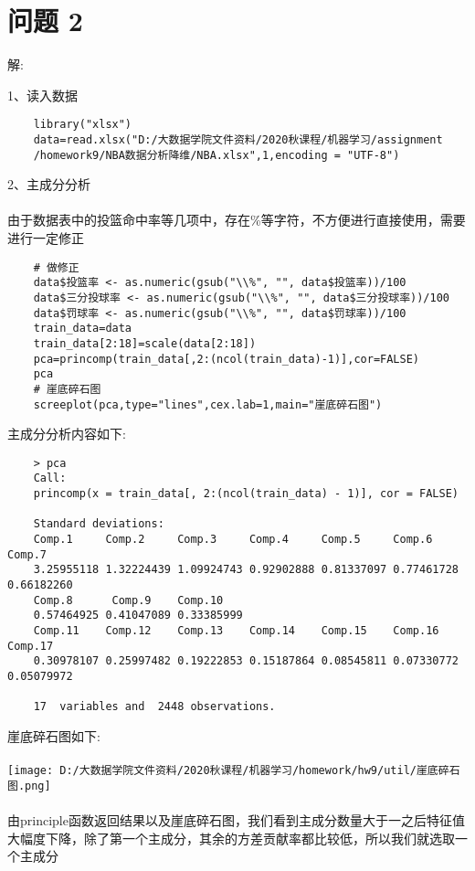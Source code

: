 \documentclass[]{article}
\begin{document}
\section{问题 2}
\begin{flushleft}
	解:
\end{flushleft}
1、读入数据
\begin{lstlisting}
	library("xlsx")
	data=read.xlsx("D:/大数据学院文件资料/2020秋课程/机器学习/assignment
	/homework9/NBA数据分析降维/NBA.xlsx",1,encoding = "UTF-8")
\end{lstlisting}
2、主成分分析\\\\
由于数据表中的投篮命中率等几项中，存在\%等字符，不方便进行直接使用，需要进行一定修正
\begin{lstlisting}
	# 做修正
	data$投篮率 <- as.numeric(gsub("\\%", "", data$投篮率))/100 
	data$三分投球率 <- as.numeric(gsub("\\%", "", data$三分投球率))/100 
	data$罚球率 <- as.numeric(gsub("\\%", "", data$罚球率))/100
	train_data=data
	train_data[2:18]=scale(data[2:18])
	pca=princomp(train_data[,2:(ncol(train_data)-1)],cor=FALSE)
	pca
	# 崖底碎石图
	screeplot(pca,type="lines",cex.lab=1,main="崖底碎石图")
\end{lstlisting}
主成分分析内容如下:
\begin{lstlisting}
	> pca
	Call:
	princomp(x = train_data[, 2:(ncol(train_data) - 1)], cor = FALSE)
	
	Standard deviations:
	Comp.1     Comp.2     Comp.3     Comp.4     Comp.5     Comp.6     Comp.7     
	3.25955118 1.32224439 1.09924743 0.92902888 0.81337097 0.77461728 0.66182260 
	Comp.8	    Comp.9    Comp.10  
	0.57464925 0.41047089 0.33385999 
	Comp.11    Comp.12    Comp.13    Comp.14    Comp.15    Comp.16    Comp.17 
	0.30978107 0.25997482 0.19222853 0.15187864 0.08545811 0.07330772 0.05079972 
	
	17  variables and  2448 observations.
\end{lstlisting}
崖底碎石图如下:\\\\
\texttt{[image: D:/大数据学院文件资料/2020秋课程/机器学习/homework/hw9/util/崖底碎石图.png]}\\\\
由principle函数返回结果以及崖底碎石图，我们看到主成分数量大于一之后特征值大幅度下降，除了第一个主成分，其余的方差贡献率都比较低，所以我们就选取一个主成分\\
\end{document}
